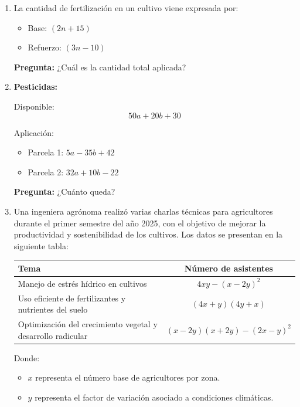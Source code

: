 \documentclass[11pt]{article}
\begin{document}
\begin{enumerate}
		\item La cantidad de fertilización en un cultivo viene expresada por:
		
		\begin{itemize}
			\item Base: $(2n + 15)$
			\item Refuerzo: $(3n - 10)$
		\end{itemize}
		
		\textbf{Pregunta:} ¿Cuál es la cantidad total aplicada?
		
		\newpage
		
		\vspace*{0.2em}
				
				
				\item \textbf{Pesticidas:}
				
				Disponible:
				\[
				50a + 20b + 30
				\]
				
				Aplicación:
				\begin{itemize}
					\item Parcela 1: $5a - 35b + 42$
					\item Parcela 2: $32a + 10b - 22$
				\end{itemize}
				
				\textbf{Pregunta:} ¿Cuánto queda?
				\item Una ingeniera agrónoma realizó varias charlas técnicas para agricultores durante el primer semestre del año 2025, con el objetivo de mejorar la productividad y sostenibilidad de los cultivos. Los datos se presentan en la siguiente tabla:
		
		\begin{center}
			\begin{tabular}{|>{\raggedright\arraybackslash}p{9cm}|c|}
				\hline
				\textbf{Tema} & \textbf{Número de asistentes} \\
				\hline
				Manejo de estrés hídrico en cultivos & $4xy - (x - 2y)^2$ \\
				\hline
				Uso eficiente de fertilizantes y nutrientes del suelo & $(4x + y)(4y + x)$ \\
				\hline
				Optimización del crecimiento vegetal y desarrollo radicular & $(x - 2y)(x + 2y) - (2x - y)^2$ \\
				\hline
			\end{tabular}
		\end{center}
		
		Donde:
		\begin{itemize}
			\item $x$ representa el número base de agricultores por zona.
			\item $y$ representa el factor de variación asociado a condiciones climáticas.
		\end{itemize}
		

\end{enumerate}
\end{document}

